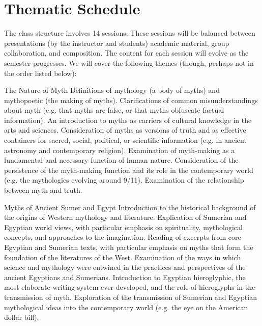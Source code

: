 \documentclass[letterpaper,10pt,headsepline]{scrreprt}
\begin{document}
\section{Thematic Schedule}
The class structure involves 14 sessions. These sessions will be
balanced between presentations (by the instructor and students)
academic material, group collaboration, and composition. The content
for each session will evolve as the semester progresses. We will cover
the following themes (though, perhaps not in the order listed below):
\\
\begin{compactdesc}

\item[The Nature of Myth]
Definitions of mythology (a body of myths) and mythopoetic (the making of myths).
Clarifications of common misunderstandings about myth (e.g. that myths are false, or that myths obfuscate factual information).
An introduction to myths as carriers of cultural knowledge in the arts and sciences.
Consideration of myths as versions of truth and as effective containers for sacred, social, political, or scientific information (e.g. in ancient astronomy and contemporary religion).
Examination of myth-making as a fundamental and necessary function of human nature.
Consideration of the persistence of the myth-making function and its role in the contemporary world (e.g. the mythologies evolving around 9/11).
Examination of the relationship between myth and truth.\\

\item[Myths of Ancient Sumer and Egypt]
Introduction to the historical background of the origins of Western mythology and literature.
Explication of Sumerian and Egyptian world views, with particular emphasis on spirituality, mythological concepts, and approaches to the imagination.
Reading of excerpts from core Egyptian and Sumerian texts, with particular emphasis on myths that form the foundation of the literatures of the West.
Examination of the ways in which science and mythology were entwined in the practices and perspectives of the ancient Egyptians and Sumerians.
Introduction to Egyptian hieroglyphic, the most elaborate writing system ever developed, and the role of hieroglyphs in the transmission of myth.
Exploration of the transmission of Sumerian and Egyptian mythological ideas into the contemporary world (e.g. the eye on the American dollar bill).\\


\end{compactdesc}
\end{document}
